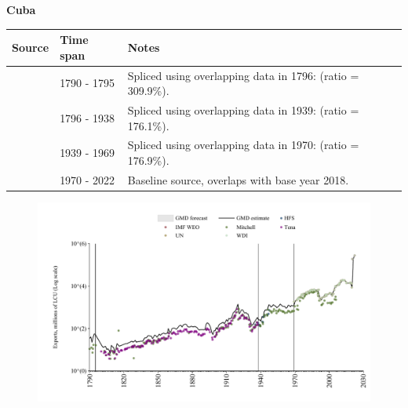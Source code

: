 \documentclass[12pt,a4paper,landscape]{article}
\begin{document}
\begin{adjustbox}{max totalsize={\paperwidth}{\paperheight},center}
\begin{minipage}[t][\textheight][t]{\textwidth}
\vspace*{0.5cm}
{}
\begin{center}
{\Large\bfseries Cuba}
\end{center}
\vspace{0.5cm}
\begin{table}[H]
\centering
\small
\begin{tabular}{|l|l|l|}
\hline
\textbf{Source} & \textbf{Time span} & \textbf{Notes} \\
\hline
\rowcolor{white}\cite{Mitchell}& 1790 - 1795 &Spliced using overlapping data in 1796: (ratio = 309.9\%).\\
\rowcolor{lightgray}\cite{Tena}& 1796 - 1938 &Spliced using overlapping data in 1939: (ratio = 176.1\%).\\
\rowcolor{white}\cite{Mitchell}& 1939 - 1969 &Spliced using overlapping data in 1970: (ratio = 176.9\%).\\
\rowcolor{lightgray}\cite{WDI}& 1970 - 2022 &Baseline source, overlaps with base year 2018.\\
\hline
\end{tabular}
\end{table}
\begin{figure}[H]
\centering
\includegraphics[width=\textwidth,height=0.6\textheight,keepaspectratio]{graphs/CUB_exports.pdf}
\end{figure}
\end{minipage}
\end{adjustbox}
\end{document}
